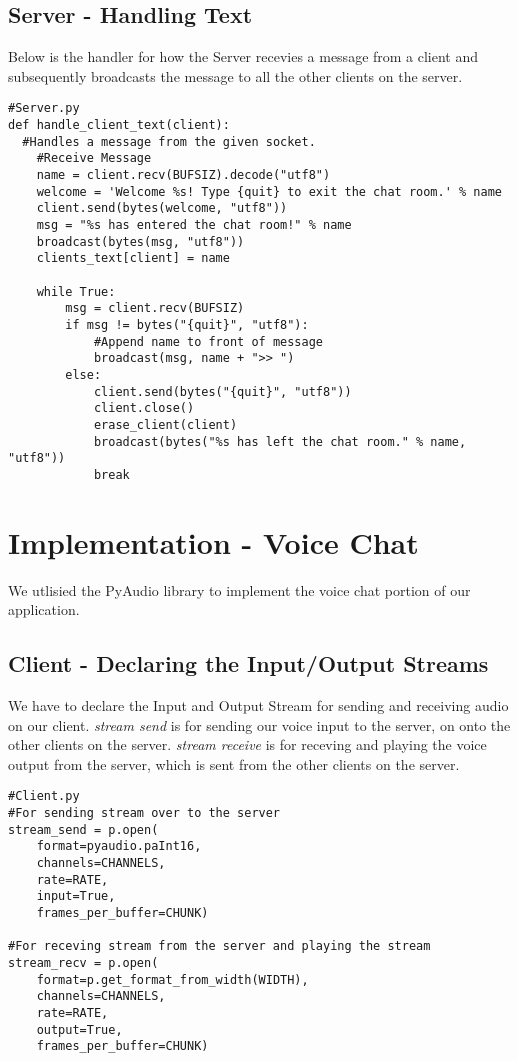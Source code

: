 \documentclass[a4paper,11pt]{article}
\begin{document}
\subsection{Server - Handling Text}
Below is the handler for how the Server recevies a message from a client and subsequently broadcasts the message to all the other clients on the server.
\begin{mdframed}[backgroundcolor=light-gray, roundcorner=30pt,leftmargin=1, rightmargin=1, innerleftmargin=5, innertopmargin=-3,innerbottommargin=5, outerlinewidth=1, linecolor=light-gray]
\begin{lstlisting}
#Server.py
def handle_client_text(client):
  #Handles a message from the given socket.
	#Receive Message
	name = client.recv(BUFSIZ).decode("utf8")
	welcome = 'Welcome %s! Type {quit} to exit the chat room.' % name
	client.send(bytes(welcome, "utf8"))
	msg = "%s has entered the chat room!" % name
	broadcast(bytes(msg, "utf8"))
	clients_text[client] = name

	while True:
		msg = client.recv(BUFSIZ)
		if msg != bytes("{quit}", "utf8"):
			#Append name to front of message
			broadcast(msg, name + ">> ")
		else:
			client.send(bytes("{quit}", "utf8"))
			client.close()
			erase_client(client)
			broadcast(bytes("%s has left the chat room." % name, "utf8"))
			break

\end{lstlisting}
\end{mdframed}


\section{Implementation - Voice Chat}
We utlisied the PyAudio library to implement the voice chat portion of our application.

\subsection{Client - Declaring the Input/Output Streams}
We have to declare the Input and Output Stream for sending and receiving audio on our client. \textit{stream send} is for sending our voice input to the server, on onto the other clients on the server. \textit{stream receive} is for receving and playing the voice output from the server, which is sent from the other clients on the server.
\begin{mdframed}[backgroundcolor=light-gray, roundcorner=30pt,leftmargin=1, rightmargin=1, innerleftmargin=5, innertopmargin=-3,innerbottommargin=5, outerlinewidth=1, linecolor=light-gray]
\begin{lstlisting}
#Client.py
#For sending stream over to the server
stream_send = p.open(
	format=pyaudio.paInt16,
	channels=CHANNELS,
	rate=RATE,
	input=True,
	frames_per_buffer=CHUNK)

#For receving stream from the server and playing the stream
stream_recv = p.open(
	format=p.get_format_from_width(WIDTH),
	channels=CHANNELS,
	rate=RATE,
	output=True,
	frames_per_buffer=CHUNK)

\end{lstlisting}
\end{mdframed}
\end{document}
